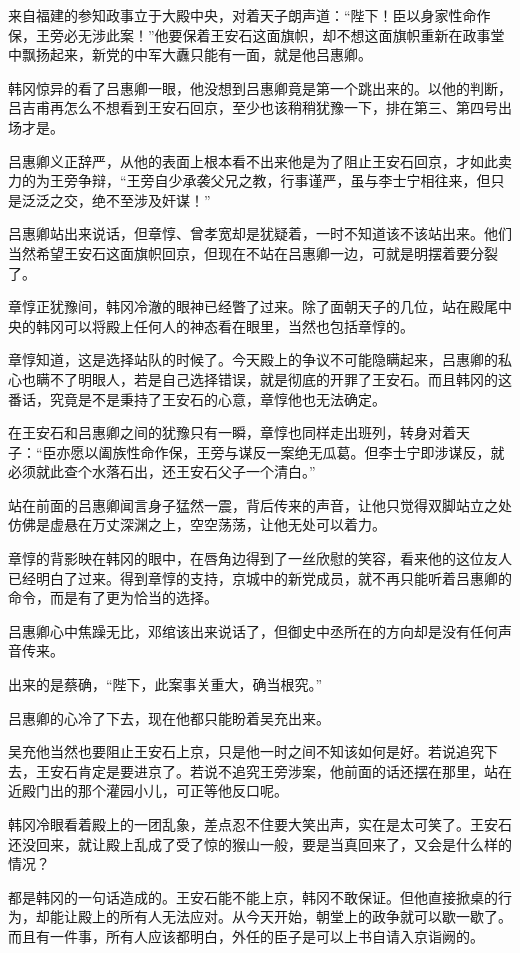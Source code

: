 来自福建的参知政事立于大殿中央，对着天子朗声道：“陛下！臣以身家性命作保，王旁必无涉此案！”他要保着王安石这面旗帜，却不想这面旗帜重新在政事堂中飘扬起来，新党的中军大纛只能有一面，就是他吕惠卿。

韩冈惊异的看了吕惠卿一眼，他没想到吕惠卿竟是第一个跳出来的。以他的判断，吕吉甫再怎么不想看到王安石回京，至少也该稍稍犹豫一下，排在第三、第四号出场才是。

吕惠卿义正辞严，从他的表面上根本看不出来他是为了阻止王安石回京，才如此卖力的为王旁争辩，“王旁自少承袭父兄之教，行事谨严，虽与李士宁相往来，但只是泛泛之交，绝不至涉及奸谋！”

吕惠卿站出来说话，但章惇、曾孝宽却是犹疑着，一时不知道该不该站出来。他们当然希望王安石这面旗帜回京，但现在不站在吕惠卿一边，可就是明摆着要分裂了。

章惇正犹豫间，韩冈冷澈的眼神已经瞥了过来。除了面朝天子的几位，站在殿尾中央的韩冈可以将殿上任何人的神态看在眼里，当然也包括章惇的。

章惇知道，这是选择站队的时候了。今天殿上的争议不可能隐瞒起来，吕惠卿的私心也瞒不了明眼人，若是自己选择错误，就是彻底的开罪了王安石。而且韩冈的这番话，究竟是不是秉持了王安石的心意，章惇他也无法确定。

在王安石和吕惠卿之间的犹豫只有一瞬，章惇也同样走出班列，转身对着天子：“臣亦愿以阖族性命作保，王旁与谋反一案绝无瓜葛。但李士宁即涉谋反，就必须就此查个水落石出，还王安石父子一个清白。”

站在前面的吕惠卿闻言身子猛然一震，背后传来的声音，让他只觉得双脚站立之处仿佛是虚悬在万丈深渊之上，空空荡荡，让他无处可以着力。

章惇的背影映在韩冈的眼中，在唇角边得到了一丝欣慰的笑容，看来他的这位友人已经明白了过来。得到章惇的支持，京城中的新党成员，就不再只能听着吕惠卿的命令，而是有了更为恰当的选择。

吕惠卿心中焦躁无比，邓绾该出来说话了，但御史中丞所在的方向却是没有任何声音传来。

出来的是蔡确，“陛下，此案事关重大，确当根究。”

吕惠卿的心冷了下去，现在他都只能盼着吴充出来。

吴充他当然也要阻止王安石上京，只是他一时之间不知该如何是好。若说追究下去，王安石肯定是要进京了。若说不追究王旁涉案，他前面的话还摆在那里，站在近殿门出的那个灌园小儿，可正等他反口呢。

韩冈冷眼看着殿上的一团乱象，差点忍不住要大笑出声，实在是太可笑了。王安石还没回来，就让殿上乱成了受了惊的猴山一般，要是当真回来了，又会是什么样的情况？

都是韩冈的一句话造成的。王安石能不能上京，韩冈不敢保证。但他直接掀桌的行为，却能让殿上的所有人无法应对。从今天开始，朝堂上的政争就可以歇一歇了。而且有一件事，所有人应该都明白，外任的臣子是可以上书自请入京诣阙的。

